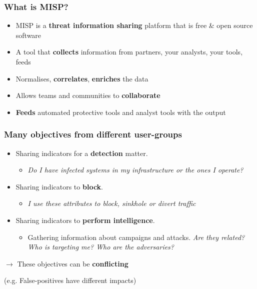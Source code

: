 \begin{frame}
\frametitle{What is MISP?}
\begin{itemize}
       \item MISP is a {\bf threat information sharing} platform that is free \& open source software
       \item A tool that {\bf collects} information from partners, your analysts, your tools, feeds
       \item Normalises, {\bf correlates}, {\bf enriches} the data
       \item Allows teams and communities to {\bf collaborate}
       \item {\bf Feeds} automated protective tools and analyst tools with the output
\end{itemize}
\end{frame}

\begin{frame}
\frametitle{Many objectives from different user-groups}
    \begin{itemize}
        \item Sharing indicators for a {\bf detection} matter.
            \begin{itemize}
                \item \textit{Do I have infected systems in my infrastructure or the ones I operate?}
            \end{itemize}
    \item Sharing indicators to {\bf block}.
            \begin{itemize}
                \item \textit{I use these attributes to block, sinkhole or divert traffic}
            \end{itemize}
    \item Sharing indicators to {\bf perform intelligence}.
            \begin{itemize}
                \item Gathering information about campaigns and attacks. \textit{Are they related? Who is targeting me? Who are the adversaries?}
            \end{itemize}
        \end{itemize}
        \vspace{1em}
        \begin{center}
        $\rightarrow$ These objectives can be {\bf conflicting}

        (e.g. False-positives have different impacts)
        \end{center}
    \end{frame}

